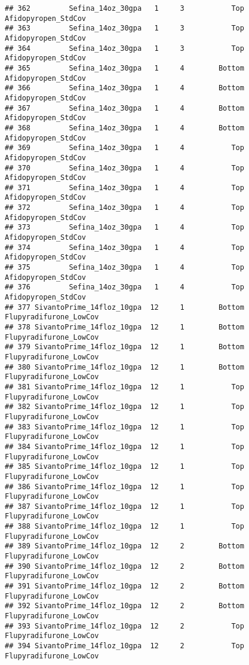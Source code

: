 \documentclass[
]{article}
\begin{document}
\begin{verbatim}
## 362         Sefina_14oz_30gpa   1     3           Top    Afidopyropen_StdCov
## 363         Sefina_14oz_30gpa   1     3           Top    Afidopyropen_StdCov
## 364         Sefina_14oz_30gpa   1     3           Top    Afidopyropen_StdCov
## 365         Sefina_14oz_30gpa   1     4        Bottom    Afidopyropen_StdCov
## 366         Sefina_14oz_30gpa   1     4        Bottom    Afidopyropen_StdCov
## 367         Sefina_14oz_30gpa   1     4        Bottom    Afidopyropen_StdCov
## 368         Sefina_14oz_30gpa   1     4        Bottom    Afidopyropen_StdCov
## 369         Sefina_14oz_30gpa   1     4           Top    Afidopyropen_StdCov
## 370         Sefina_14oz_30gpa   1     4           Top    Afidopyropen_StdCov
## 371         Sefina_14oz_30gpa   1     4           Top    Afidopyropen_StdCov
## 372         Sefina_14oz_30gpa   1     4           Top    Afidopyropen_StdCov
## 373         Sefina_14oz_30gpa   1     4           Top    Afidopyropen_StdCov
## 374         Sefina_14oz_30gpa   1     4           Top    Afidopyropen_StdCov
## 375         Sefina_14oz_30gpa   1     4           Top    Afidopyropen_StdCov
## 376         Sefina_14oz_30gpa   1     4           Top    Afidopyropen_StdCov
## 377 SivantoPrime_14floz_10gpa  12     1        Bottom Flupyradifurone_LowCov
## 378 SivantoPrime_14floz_10gpa  12     1        Bottom Flupyradifurone_LowCov
## 379 SivantoPrime_14floz_10gpa  12     1        Bottom Flupyradifurone_LowCov
## 380 SivantoPrime_14floz_10gpa  12     1        Bottom Flupyradifurone_LowCov
## 381 SivantoPrime_14floz_10gpa  12     1           Top Flupyradifurone_LowCov
## 382 SivantoPrime_14floz_10gpa  12     1           Top Flupyradifurone_LowCov
## 383 SivantoPrime_14floz_10gpa  12     1           Top Flupyradifurone_LowCov
## 384 SivantoPrime_14floz_10gpa  12     1           Top Flupyradifurone_LowCov
## 385 SivantoPrime_14floz_10gpa  12     1           Top Flupyradifurone_LowCov
## 386 SivantoPrime_14floz_10gpa  12     1           Top Flupyradifurone_LowCov
## 387 SivantoPrime_14floz_10gpa  12     1           Top Flupyradifurone_LowCov
## 388 SivantoPrime_14floz_10gpa  12     1           Top Flupyradifurone_LowCov
## 389 SivantoPrime_14floz_10gpa  12     2        Bottom Flupyradifurone_LowCov
## 390 SivantoPrime_14floz_10gpa  12     2        Bottom Flupyradifurone_LowCov
## 391 SivantoPrime_14floz_10gpa  12     2        Bottom Flupyradifurone_LowCov
## 392 SivantoPrime_14floz_10gpa  12     2        Bottom Flupyradifurone_LowCov
## 393 SivantoPrime_14floz_10gpa  12     2           Top Flupyradifurone_LowCov
## 394 SivantoPrime_14floz_10gpa  12     2           Top Flupyradifurone_LowCov

\end{verbatim}
\end{document}

